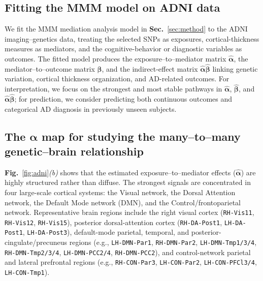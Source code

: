\documentclass[
  12pt]{article}
\begin{document}
\subsection{Fitting the MMM model on ADNI data}
We fit the MMM mediation analysis model in \textbf{Sec.}~\ref{sec:method} to the ADNI imaging--genetics data, treating the selected SNPs as exposures, cortical-thickness measures as mediators, and the cognitive-behavior or diagnostic variables as outcomes.
The fitted model produces the exposure--to--mediator matrix $\widehat{\bm{\alpha}}$, the mediator--to--outcome matrix $\widehat{\bm{\beta}}$, and the indirect-effect matrix $\widehat{\bm{\alpha}}\widehat{\bm{\beta}}$ linking genetic variation, cortical thickness organization, and AD-related outcomes.
For interpretation, we focus on the strongest and most stable pathways in $\widehat{\bm{\alpha}}$, $\widehat{\bm{\beta}}$, and $\widehat{\bm{\alpha}}\widehat{\bm{\beta}}$; for prediction, we consider predicting both continuous outcomes and categorical AD diagnosis in previously unseen subjects.

\subsection{The \texorpdfstring{$\bm{\alpha}$}{alpha} map for studying the many--to--many genetic--brain relationship}
\textbf{Fig.}~\ref{fig:adni}\textit{(b)} shows that the estimated exposure--to--mediator effects
($\widehat{\bm{\alpha}}$) are highly structured rather than diffuse.
The strongest signals are concentrated in four large-scale cortical systems:
the Visual network, the Dorsal Attention network, the Default Mode network (DMN),
and the Control/frontoparietal network.
Representative brain regions include the right visual cortex
(\texttt{RH-Vis11}, \texttt{RH-Vis12}, \texttt{RH-Vis15}),
posterior dorsal-attention cortex
(\texttt{RH-DA-Post1}, \texttt{LH-DA-Post1}, \texttt{LH-DA-Post3}),
default-mode parietal, temporal, and posterior-cingulate/precuneus regions
(e.g., \texttt{LH-DMN-Par1}, \texttt{RH-DMN-Par2},
\texttt{LH-DMN-Tmp1/3/4}, \texttt{RH-DMN-Tmp2/3/4},
\texttt{LH-DMN-PCC2/4}, \texttt{RH-DMN-PCC2}),
and control-network parietal and lateral prefrontal regions
(e.g., \texttt{RH-CON-Par3}, \texttt{LH-CON-Par2},
\texttt{LH-CON-PFCl3/4}, \texttt{LH-CON-Tmp1}).
\end{document}
